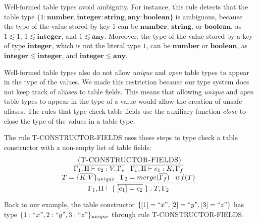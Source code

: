 \documentclass{sigplanconf}
\newcommand{\Any}{\mathbf{any}}
\newcommand{\Boolean}{\mathbf{boolean}}
\newcommand{\Integer}{\mathbf{integer}}
\newcommand{\Number}{\mathbf{number}}
\newcommand{\String}{\mathbf{string}}
\newcommand{\mylabel}[1]{\; (\textsc{#1})}
\newcommand{\env}{\Gamma}
\newcommand{\penv}{\Pi}
\begin{document}
Well-formed table types avoid ambiguity.
For instance, this rule detects that the table type
$\{1:\Number, \Integer:\String, \Any:\Boolean\}$ is ambiguous,
because the type of the value stored by key $1$ can be
$\Number$, $\String$, or $\Boolean$, as $1 \lesssim 1$,
$1 \lesssim \Integer$, and $1 \lesssim \Any$.
Moreover, the type of the value stored by a key of type $\Integer$,
which is not the literal type $1$, can be $\Number$ or $\Boolean$,
as $\Integer \lesssim \Integer$, and $\Integer \lesssim \Any$.

Well-formed table types also do not allow \emph{unique} and
\emph{open} table types to appear in the type of the values.
We made this restriction because our type system does not keep
track of aliases to table fields.
This means that allowing \emph{unique} and \emph{open} table
types to appear in the type of a value would allow the
creation of unsafe aliases.
The rules that type check table fields use the auxiliary function
\emph{close} to close the type of the values in a table type.

The rule \textsc{T-CONSTRUCTOR-FIELDS} uses these steps to type check a
table constructor with a non-empty list of table fields:
\[
\begin{array}{c}
\mylabel{T-CONSTRUCTOR-FIELDS}\\
\dfrac{\begin{array}{c}
       \overline{\env_1, \penv \vdash e_2: V, \env_v}
        \;\;\;
       \overline{\env_v, \penv \vdash e_1: K, \env_f}
        \\
       T = \{\overline{K{:}V}\}_{unique} \;\;\;
       \env_{2} = merge(\overline{\env_{f}}) \;\;\; wf(T)
       \end{array}}
      {\env_{1}, \penv \vdash \{\;\overline{[e_{1}] = e_{2}}\;\}:T, \env_{2}}
\end{array}
\]

Back to our example, the table constructor
$\{ [1] = ``x", [2] = ``y", [3] = ``z" \}$ has type
$\{1:``x", 2:``y", 3:``z"\}_{unique}$ through rule \textsc{T-CONSTRUCTOR-FIELDS}.
\end{document}
